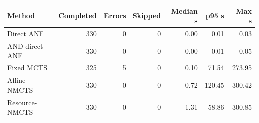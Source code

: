 \begin{tabular}{lrrrrrr}
\toprule
Method & Completed & Errors & Skipped & Median s & p95 s & Max s \\
\midrule
Direct ANF & 330 & 0 & 0 & 0.00 & 0.01 & 0.03 \\
AND-direct ANF & 330 & 0 & 0 & 0.00 & 0.01 & 0.05 \\
Fixed MCTS & 325 & 5 & 0 & 0.10 & 71.54 & 273.95 \\
Affine-NMCTS & 330 & 0 & 0 & 0.72 & 120.45 & 300.42 \\
Resource-NMCTS & 330 & 0 & 0 & 1.31 & 58.86 & 300.85 \\
\bottomrule
\end{tabular}

